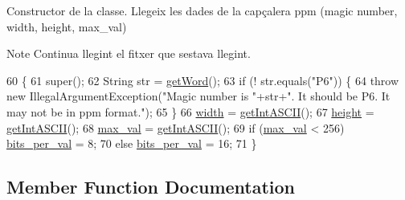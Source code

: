 Constructor de la classe. Llegeix les dades de la capçalera ppm (magic number, width, height, max\+\_\+val) 

\begin{DoxyNote}{Note}
Continua llegint el fitxer que s\textquotesingle{}estava llegint. 
\end{DoxyNote}

\begin{DoxyCode}
60                             \{
61         super();
62         String str = \hyperlink{classpersistencia_1_1input_1_1Ctrl__Input__Img_a17676e8616da5821ca2323da4691d240}{getWord}();
63         \textcolor{keywordflow}{if} (! str.equals(\textcolor{stringliteral}{"P6"})) \{
64             \textcolor{keywordflow}{throw} \textcolor{keyword}{new} IllegalArgumentException(\textcolor{stringliteral}{"Magic number is "}+str+\textcolor{stringliteral}{". It should be P6. It may not be in
       ppm format."});
65         \}
66         \hyperlink{classpersistencia_1_1input_1_1Ctrl__Input__Img_a51dd0b9243b854aa25ac4532acca4524}{width} = \hyperlink{classpersistencia_1_1input_1_1Ctrl__Input__Img_a430158ff229038ddc3476d406239f4cd}{getIntASCII}();
67         \hyperlink{classpersistencia_1_1input_1_1Ctrl__Input__Img_abc1dcc48714e9e74fb8ae0e0b81f91bf}{height} = \hyperlink{classpersistencia_1_1input_1_1Ctrl__Input__Img_a430158ff229038ddc3476d406239f4cd}{getIntASCII}();
68         \hyperlink{classpersistencia_1_1input_1_1Ctrl__Input__Img_a1b8fa2d000a1d5d873be62d1f609e4be}{max\_val} = \hyperlink{classpersistencia_1_1input_1_1Ctrl__Input__Img_a430158ff229038ddc3476d406239f4cd}{getIntASCII}();
69         \textcolor{keywordflow}{if} (\hyperlink{classpersistencia_1_1input_1_1Ctrl__Input__Img_a1b8fa2d000a1d5d873be62d1f609e4be}{max\_val} < 256) \hyperlink{classpersistencia_1_1input_1_1Ctrl__Input__Img_a222ad0e7d241e5f396cf67c3b760f143}{bits\_per\_val} = 8;
70         \textcolor{keywordflow}{else}               \hyperlink{classpersistencia_1_1input_1_1Ctrl__Input__Img_a222ad0e7d241e5f396cf67c3b760f143}{bits\_per\_val} = 16;
71     \}
\end{DoxyCode}


\subsection{Member Function Documentation}
\mbox{\label{classpersistencia_1_1input_1_1Ctrl__Input__Img_ac549527b5947a7ec9f40d53e492f4ffa}} 
